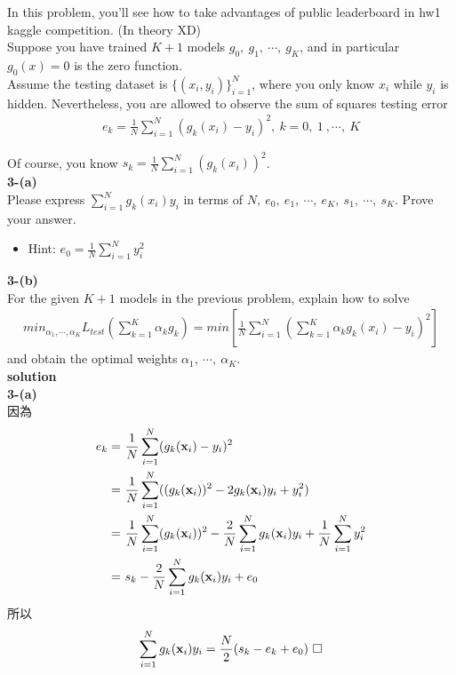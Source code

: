 \documentclass{article}
\begin{document}
In this problem, you'll see how to take advantages of public leaderboard in hw1 kaggle competition. (In theory XD)\\

Suppose you have trained $K + 1$ models $g_0,\ g_1,\ \cdots,\ g_K$, and in particular $g_0(x) = 0$ is the zero function.\\

Assume the testing dataset is $\{(x_i, y_i)\}^N_{i = 1}$, where you only know $x_i$ while $y_i$ is hidden. Nevertheless, you are allowed to observe the sum of squares testing error
\begin{align*}
    e_k = \frac{1}{N} \sum_{i = 1}^N(g_k(x_i) − y_i)^2,\ k = 0,\ 1\ ,\cdots,\ K
\end{align*}

Of course, you know $s_k = \frac{1}{N} \sum^N_{i = 1}(g_k(x_i))^2$.\\

\noindent
{\bf 3-(a)}\\

Please express $\sum^N_{i = 1}g_k(x_i)y_i$ in terms of $N,\ e_0,\ e_1,\ \cdots,\ e_K,\ s_1,\ \cdots,\ s_K$. Prove your answer.

\begin{itemize}
    \item Hint: $e_0 = \frac{1}{N} \sum^N_{i = 1}y^2_i$
\end{itemize}

\noindent
{\bf 3-(b)}\\

For the given $K + 1$ models in the previous problem, explain how to solve
\begin{align*}
    min_{\alpha_1, \cdots, \alpha_K} L_{test}(\sum^K_{k = 1} \alpha_k g_k) = min[\frac{1}{N} \sum^N_{i = 1}(\sum^K_{k = 1} \alpha_k g_k(x_i) − y_i)^2]
\end{align*}
and obtain the optimal weights $\alpha_1,\ \cdots,\ \alpha_K$.\\

\noindent
{\bf \large solution}\\

\noindent
{\bf 3-(a)}\\

\noindent
因為
\begin{align*}
    e_k =\ &\frac{1}{N} \sum_{i = 1}^{N} (g_k({\bf x}_i) - y_i)^2\\
    =\ &\frac{1}{N} \sum_{i = 1}^{N} ((g_k({\bf x}_i))^2 - 2g_k({\bf x}_i)y_i + y_i^2)\\
    =\ &\frac{1}{N} \sum_{i = 1}^{N} (g_k({\bf x}_i))^2 - \frac{2}{N} \sum_{i = 1}^{N} g_k({\bf x}_i)y_i + \frac{1}{N} \sum_{i = 1}^{N} y_i^2\\
    =\ &s_k - \frac{2}{N} \sum_{i = 1}^{N} g_k({\bf x}_i)y_i + e_0
\end{align*}
所以
\begin{align*}
    \sum_{i = 1}^{N} g_k({\bf x}_i)y_i = \frac{N}{2}(s_k - e_k + e_0)\ \square
\end{align*}
\end{document}
